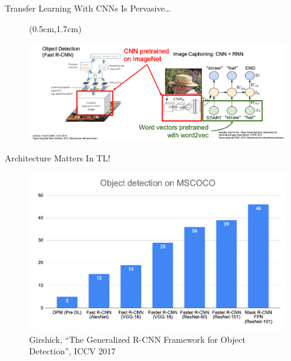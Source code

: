 \documentclass[serif, aspectratio=169]{beamer}
\begin{document}
\begin{frame}{Transfer Learning With CNNs Is Pervasive…}
	\begin{figure}[htpb]
		\begin{textblock*}{2cm}(0.5cm,1.7cm) %
			\begin{center}
				\includegraphics[keepaspectratio, scale=0.29]{pic/TL_examples2}
			\end{center}
		\end{textblock*}
	\end{figure}
\end{frame}

\begin{frame}{Architecture Matters In TL!}
	\begin{figure}[htpb]
		\begin{center}
			\includegraphics[keepaspectratio, scale=0.25]{pic/od_mscoco}
			\captionsetup{justification=centering}
			\caption*{\scriptsize Girshick, “The Generalized R-CNN Framework for Object Detection”, ICCV 2017}
		\end{center}
	\end{figure}
\end{frame}
\end{document}
